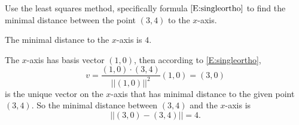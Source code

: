\documentclass{ximera}
\begin{document}
\begin{exercise} \label{YZ_9.1.1}

Use the least squares method, specifically formula $\eqref{E:singleortho}$ to 
find the minimal distance between the point $(3,4)$ to the $x$-axis.

\begin{solution}
\ans 
The minimal distance to the $x$-axis is $4$.

\soln
The $x$-axis has basis vector $(1,0)$, then according to \eqref{E:singleortho},  
\[
v = \frac{(1,0)\cdot (3,4)}{||(1,0)||^2}(1,0) = (3,0)
\]
is the unique vector on the $x$-axis that has minimal distance to the given point $(3,4)$. 
So the minimal distance between $(3,4)$ and the $x$-axis is 
\[
||(3,0)-(3,4)|| = 4.
\]

\end{solution}
\end{exercise}
\end{document}
